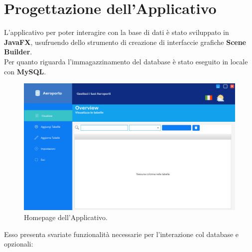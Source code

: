 
\newpage

\enlargethispage{1\linewidth}

\section{Progettazione dell'Applicativo}

\textsf{\small L'applicativo per poter interagire con la base di dati è stato sviluppato in \textbf{JavaFX}, usufruendo dello strumento di creazione di interfaccie grafiche \textbf{Scene Builder}. }\\

\textsf{\small Per quanto riguarda l'immagazzinamento del database è stato eseguito in locale con \textbf{MySQL}.}\\

\begin{figure}[ht] 
	\centering
	\includegraphics[width=1\textwidth, height=1\textheight, keepaspectratio]{./img/Applicativo/homepage.png}
	\caption{Homepage dell'Applicativo.}
	\label{fig:homepage}
\end{figure}

\textsf{\small Esso presenta svariate funzionalità necessarie per l'interazione col database e opzionali: } 

